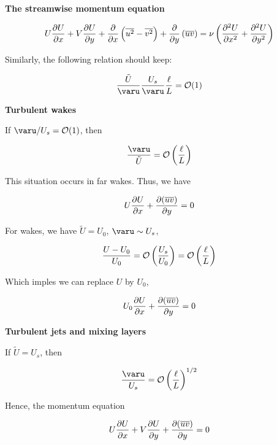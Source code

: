 \documentclass{article}
\begin{document}
\textbf{The streamwise momentum equation}

\begin{equation*}
    U\frac{\p U}{\p x}+V\frac{\p U}{\p y}+\frac{\p}{\p x}\left(\overline{u^2}-\overline{v^2}\right)+\frac{\p}{\p y}\left(\overline{uv}\right)=\nu\left(\frac{\p^2 U}{\p x^2}+\frac{\p^2 U}{\p y^2}\right)
\end{equation*}

Similarly, the following relation should keep:

\begin{equation*}
    \frac{\tilde{U}}{\varu}\frac{U_s}{\varu}\frac{\ell}{L}=\Order(1)
\end{equation*}

\textbf{Turbulent wakes}

If $\varu/U_s=\Order(1)$, then

\begin{equation*}
    \frac{\varu}{\tilde{U}}=\Order\left(\frac{\ell}{L}\right)
\end{equation*}

This situation occurs in far wakes. Thus, we have

\begin{equation*}
    U\frac{\mathop{}\!\partial U}{\mathop{}\!\partial x}+\frac{\mathop{}\!\partial(\overline{uv})}{\mathop{}\!\partial y}=0
\end{equation*}

For wakes, we have $\tilde{U}=U_0$, $\varu\sim U_s$,

\begin{equation*}
    \frac{U-U_0}{U_0}=\mathcal{O}\left(\frac{U_s}{U_0}\right)=\mathcal{O}\left(\frac{\ell}{L}\right)
\end{equation*}

Which imples we can replace $U$ by $U_0$,

\begin{equation*}
    U_0\frac{\mathop{}\!\partial U}{\mathop{}\!\partial x}+\frac{\mathop{}\!\partial(\overline{uv})}{\mathop{}\!\partial y}=0
\end{equation*}

\textbf{Turbulent jets and mixing layers}

If $\tilde{U}=U_s$, then

\begin{equation*}
    \frac{\varu}{U_s}=\Order\left(\frac{\ell}{L}\right)^{1/2}
\end{equation*}

Hence, the momentum equation

\begin{equation*}
    U\frac{\mathop{}\!\partial U}{\mathop{}\!\partial x}+V\frac{\mathop{}\!\partial U}{\mathop{}\!\partial y}+\frac{\mathop{}\!\partial(\overline{uv})}{\mathop{}\!\partial y}=0
\end{equation*}
\end{document}
